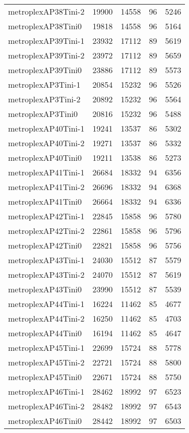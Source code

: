 \begin{tabular}{lrrrr}
metroplexAP38Tini-2 & 19900 & 14558 & 96 & 5246 \\
metroplexAP38Tini0 & 19818 & 14558 & 96 & 5164 \\
metroplexAP39Tini-1 & 23932 & 17112 & 89 & 5619 \\
metroplexAP39Tini-2 & 23972 & 17112 & 89 & 5659 \\
metroplexAP39Tini0 & 23886 & 17112 & 89 & 5573 \\
metroplexAP3Tini-1 & 20854 & 15232 & 96 & 5526 \\
metroplexAP3Tini-2 & 20892 & 15232 & 96 & 5564 \\
metroplexAP3Tini0 & 20816 & 15232 & 96 & 5488 \\
metroplexAP40Tini-1 & 19241 & 13537 & 86 & 5302 \\
metroplexAP40Tini-2 & 19271 & 13537 & 86 & 5332 \\
metroplexAP40Tini0 & 19211 & 13538 & 86 & 5273 \\
metroplexAP41Tini-1 & 26684 & 18332 & 94 & 6356 \\
metroplexAP41Tini-2 & 26696 & 18332 & 94 & 6368 \\
metroplexAP41Tini0 & 26664 & 18332 & 94 & 6336 \\
metroplexAP42Tini-1 & 22845 & 15858 & 96 & 5780 \\
metroplexAP42Tini-2 & 22861 & 15858 & 96 & 5796 \\
metroplexAP42Tini0 & 22821 & 15858 & 96 & 5756 \\
metroplexAP43Tini-1 & 24030 & 15512 & 87 & 5579 \\
metroplexAP43Tini-2 & 24070 & 15512 & 87 & 5619 \\
metroplexAP43Tini0 & 23990 & 15512 & 87 & 5539 \\
metroplexAP44Tini-1 & 16224 & 11462 & 85 & 4677 \\
metroplexAP44Tini-2 & 16250 & 11462 & 85 & 4703 \\
metroplexAP44Tini0 & 16194 & 11462 & 85 & 4647 \\
metroplexAP45Tini-1 & 22699 & 15724 & 88 & 5778 \\
metroplexAP45Tini-2 & 22721 & 15724 & 88 & 5800 \\
metroplexAP45Tini0 & 22671 & 15724 & 88 & 5750 \\
metroplexAP46Tini-1 & 28462 & 18992 & 97 & 6523 \\
metroplexAP46Tini-2 & 28482 & 18992 & 97 & 6543 \\
metroplexAP46Tini0 & 28442 & 18992 & 97 & 6503 \\

\end{tabular}
